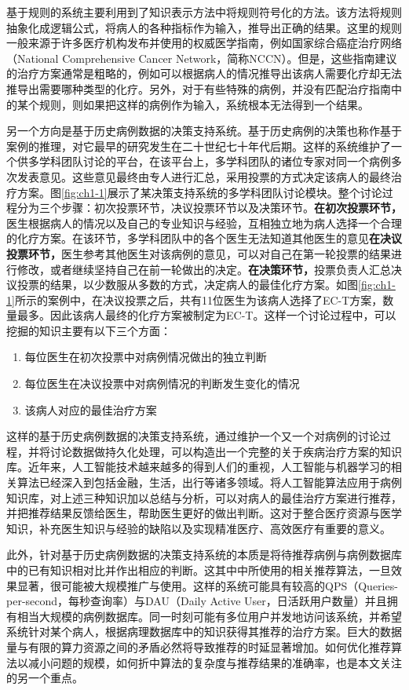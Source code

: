 基于规则的系统主要利用到了知识表示方法中将规则符号化的方法\cite{Ligêza2006}。该方法将规则抽象化成逻辑公式，将病人的各种指标作为输入，推导出正确的结果。这里的规则一般来源于许多医疗机构发布并使用的权威医学指南，例如国家综合癌症治疗网络（National Comprehensive Cancer Network，简称NCCN）\cite{Mohler2010The}。但是，这些指南建议的治疗方案通常是粗略的，例如可以根据病人的情况推导出该病人需要化疗却无法推导出需要哪种类型的化疗。另外，对于有些特殊的病例，并没有匹配治疗指南中的某个规则，则如果把这样的病例作为输入，系统根本无法得到一个结果。

另一个方向是基于历史病例数据的决策支持系统。基于历史病例的决策也称作基于案例的推理，对它最早的研究发生在二十世纪七十年代后期\cite{Schank1988SCRIPTS,Schank1982Dynamic}。这样的系统维护了一个供多学科团队讨论的平台，在该平台上，多学科团队的诸位专家对同一个病例多次发表意见。这些意见最终由专人进行汇总，采用投票的方式决定该病人的最终治疗方案。图\ref{fig:ch1-1}展示了某决策支持系统的多学科团队讨论模块。整个讨论过程分为三个步骤：初次投票环节，决议投票环节以及决策环节。\textbf{在初次投票环节，}医生根据病人的情况以及自己的专业知识与经验，互相独立地为病人选择一个合理的化疗方案。在该环节，多学科团队中的各个医生无法知道其他医生的意见\textbf{在决议投票环节，}医生参考其他医生对该病例的意见，可以对自己在第一轮投票的结果进行修改，或者继续坚持自己在前一轮做出的决定。\textbf{在决策环节，}投票负责人汇总决议投票的结果，以少数服从多数的方式，决定病人的最佳化疗方案。如图\ref{fig:ch1-1}所示的案例中，在决议投票之后，共有11位医生为该病人选择了EC-T方案，数量最多。因此该病人最终的化疗方案被制定为EC-T。这样一个讨论过程中，可以挖掘的知识主要有以下三个方面：
\begin{enumerate}
  \item 每位医生在初次投票中对病例情况做出的独立判断
  \item 每位医生在决议投票中对病例情况的判断发生变化的情况
  \item 该病人对应的最佳治疗方案
\end{enumerate}
这样的基于历史病例数据的决策支持系统，通过维护一个又一个对病例的讨论过程，并将讨论数据做持久化处理，可以构造出一个完整的关于疾病治疗方案的知识库。近年来，人工智能技术越来越多的得到人们的重视，人工智能与机器学习的相关算法已经深入到包括金融，生活，出行等诸多领域。将人工智能算法应用于病例知识库，对上述三种知识加以总结与分析，可以对病人的最佳治疗方案进行推荐，并把推荐结果反馈给医生，帮助医生更好的做出判断。这对于整合医疗资源与医学知识，补充医生知识与经验的缺陷以及实现精准医疗、高效医疗有重要的意义。

此外，针对基于历史病例数据的决策支持系统的本质是将待推荐病例与病例数据库中的已有知识相对比并作出相应的判断。这其中中所使用的相关推荐算法，一旦效果显著，很可能被大规模推广与使用。这样的系统可能具有较高的QPS（Queries-per-second，每秒查询率）与DAU（Daily Active User，日活跃用户数量）并且拥有相当大规模的病例数据库。同一时刻可能有多位用户并发地访问该系统，并希望系统针对某个病人，根据病理数据库中的知识获得其推荐的治疗方案。巨大的数据量与有限的算力资源之间的矛盾必然将导致推荐的时延显著增加。如何优化推荐算法以减小问题的规模，如何折中算法的复杂度与推荐结果的准确率，也是本文关注的另一个重点。

